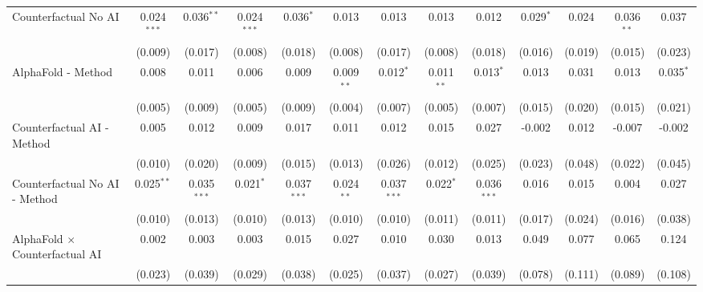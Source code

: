 \begin{tabular}{lcccccccccccc}
   Counterfactual No AI                                       & 0.024$^{***}$ & 0.036$^{**}$  & 0.024$^{***}$ & 0.036$^{*}$   & 0.013        & 0.013         & 0.013        & 0.012         & 0.029$^{*}$  & 0.024        & 0.036$^{**}$  & 0.037\\   
                                                              & (0.009)       & (0.017)       & (0.008)       & (0.018)       & (0.008)      & (0.017)       & (0.008)      & (0.018)       & (0.016)      & (0.019)      & (0.015)       & (0.023)\\   
   AlphaFold - Method                                         & 0.008         & 0.011         & 0.006         & 0.009         & 0.009$^{**}$ & 0.012$^{*}$   & 0.011$^{**}$ & 0.013$^{*}$   & 0.013        & 0.031        & 0.013         & 0.035$^{*}$\\   
                                                              & (0.005)       & (0.009)       & (0.005)       & (0.009)       & (0.004)      & (0.007)       & (0.005)      & (0.007)       & (0.015)      & (0.020)      & (0.015)       & (0.021)\\   
   Counterfactual AI - Method                                 & 0.005         & 0.012         & 0.009         & 0.017         & 0.011        & 0.012         & 0.015        & 0.027         & -0.002       & 0.012        & -0.007        & -0.002\\   
                                                              & (0.010)       & (0.020)       & (0.009)       & (0.015)       & (0.013)      & (0.026)       & (0.012)      & (0.025)       & (0.023)      & (0.048)      & (0.022)       & (0.045)\\   
   Counterfactual No AI - Method                              & 0.025$^{**}$  & 0.035$^{***}$ & 0.021$^{*}$   & 0.037$^{***}$ & 0.024$^{**}$ & 0.037$^{***}$ & 0.022$^{*}$  & 0.036$^{***}$ & 0.016        & 0.015        & 0.004         & 0.027\\   
                                                              & (0.010)       & (0.013)       & (0.010)       & (0.013)       & (0.010)      & (0.010)       & (0.011)      & (0.011)       & (0.017)      & (0.024)      & (0.016)       & (0.038)\\   
   AlphaFold $\times$ Counterfactual AI                       & 0.002         & 0.003         & 0.003         & 0.015         & 0.027        & 0.010         & 0.030        & 0.013         & 0.049        & 0.077        & 0.065         & 0.124\\   
                                                              & (0.023)       & (0.039)       & (0.029)       & (0.038)       & (0.025)      & (0.037)       & (0.027)      & (0.039)       & (0.078)      & (0.111)      & (0.089)       & (0.108)\\   

\end{tabular}

